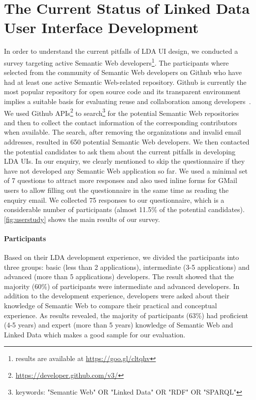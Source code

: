\documentclass{acm_proc_article-sp}
\begin{document}
\section{The Current Status of Linked Data User Interface Development}
In order to understand the current pitfalls of LDA UI design, we conducted a survey targeting %
active Semantic Web developers\footnote{results are available at \url{https://goo.gl/cltqhv}}.
The participants where selected from the community of Semantic Web developers on Github who have had at least one active Semantic Web-related repository.
Github is currently the most popular repository for open source code and its transparent environment implies a suitable basis for evaluating reuse and collaboration among developers~\cite{Lima14,Tsay2014}.
We used Github APIs\footnote{\url{https://developer.github.com/v3/}} to search\footnote{keywords: "Semantic Web" OR "Linked Data" OR "RDF" OR "SPARQL"} for the potential Semantic Web repositories and then to collect the contact information of the corresponding contributors when available.
The search, after removing the organizations and invalid email addresses, resulted in 650 potential Semantic Web developers.
We then contacted the potential candidates to ask them about the current pitfalls in developing LDA UIs.
In our enquiry, we clearly mentioned to skip the questionnaire if they have not developed any Semantic Web application so far.
We used a minimal set of 7 questions to attract more responses and also used inline forms for GMail users to allow filling out the questionnaire in the same time as reading the enquiry email.
We collected 75 responses to our questionnaire, which is a considerable number of participants (almost 11.5\% of the potential candidates).
\autoref{fig:userstudy} shows the main results of our survey.

\paragraph{Participants}
Based on their LDA development experience, we divided the participants into three groups: basic (less than 2 applications), intermediate (3-5 applications) and advanced (more than 5 applications) developers.
The result showed that the majority (60\%) of participants were intermediate and advanced developers.
In addition to the development experience, developers were asked about their knowledge of Semantic Web to compare their practical and conceptual experience.
As results revealed, the majority of participants (63\%) had proficient (4-5 years) and expert (more than 5 years) knowledge of Semantic Web and Linked Data which makes a good sample for our evaluation. 
\end{document}
